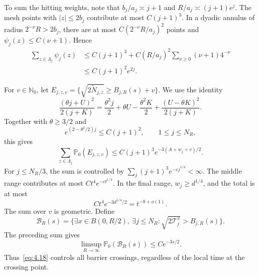 \documentclass[11pt,letterpaper,reqno]{amsart}
\numberwithin{equation}{section}
\theoremstyle{remark}
\begin{document}
To sum the hitting weights, note that $b_j/a_j\asymp j+1$ and
$R/a_j\asymp(j+1)e^j$. The mesh points with $|z|\le2b_j$ contribute at most $C(j+1)^3$. In a dyadic annulus of radius $2^{-\nu}R>2b_j$, there are at most $C(2^{-\nu}R/a_j)^2$ points and $\psi_j(z)\le C(\nu+1)$. Hence
\begin{equation}\label{eq:4.15}
\begin{aligned}
\sum_{z\in\Lambda_j}\psi_j(z)
&\le C(j+1)^3+C(R/a_j)^2\sum_{\nu\ge0}(\nu+1)4^{-\nu}\\
&\le C(j+1)^2e^{2j}.
\end{aligned}
\end{equation}

For $v\in\mathbb N_0$, let
$E_{j,z,v}=\{\sqrt{2\widetilde N_{j,z}}\ge B_{j,R}(s)+v\}$.
We use the identity
\begin{equation}\label{eq:4.16}
\frac{(\theta j+U)^2}{2(j+K)}
=\frac{\theta^2j}{2}+\theta U-\frac{\theta^2K}{2}
+\frac{(U-\theta K)^2}{2(j+K)}.
\end{equation}
Together with $\theta\ge3/2$ and
\[
e^{(2-\theta^2/2)j}\le C(j+1)^2,\qquad 1\le j\le N_R,
\]
this gives
\begin{equation}\label{eq:4.17}
\sum_{z\in\Lambda_j}\mathbb P_0(E_{j,z,v})
\le C(j+1)^3e^{-3(A+w_j+v)/2}.
\end{equation}
For $j\le N_R/3$, the sum is controlled by $\sum_j(j+1)^3e^{-cj^{1/4}}<\infty$. The middle range contributes at most $Ct^4e^{-ct^{1/4}}$. In the final range, $w_j\ge d^{1/4}$, and the total is at most
\[
Ct^4e^{-3d^{1/4}/2}=t^{-8+o(1)}.
\]
The sum over $v$ is geometric. Define
\[
\mathcal B_R(s)=\{\exists x\in B(0,R/2),\ \exists j\le N_R:
\sqrt{2\mathcal T_j^x}>B_{j,R}(s)\}.
\]
The preceding sum gives
\begin{equation}\label{eq:4.18}
\limsup_{R\to\infty}\mathbb P_0(\mathcal B_R(s))\le Ce^{-3s/2}.
\end{equation}
Thus~\eqref{eq:4.18} controls all barrier crossings, regardless of the local time at the crossing point.
\end{document}
